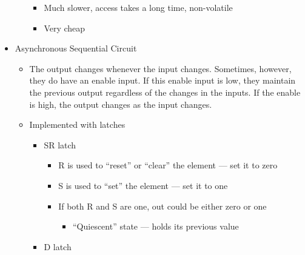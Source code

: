 \begin{itemize}
\begin{itemize}
\begin{itemize}
          \item Much slower, access takes a long time, non-volatile

          \item Very cheap

        \end{itemize}

    \end{itemize}

  \item Asynchronous Sequential Circuit

    \begin{itemize}

      \item The output changes whenever the input changes. Sometimes, however, they do have an enable input. If this enable input is low, they maintain the previous output regardless of the changes in the inputs. If the enable is high, the output changes as the input changes. 

      \item Implemented with latches

        \begin{itemize}

          \item SR latch

            \begin{itemize}

              \item R is used to ``reset'' or ``clear'' the element — set it to zero

              \item S is used to ``set'' the element — set it to one

              \item If both R and S are one, out could be either zero or one

                \begin{itemize}

                  \item ``Quiescent'' state — holds its previous value

                \end{itemize}

            \end{itemize}

          \item D latch

            \begin{itemize}


\end{itemize}
\end{itemize}
\end{itemize}
\end{itemize}
